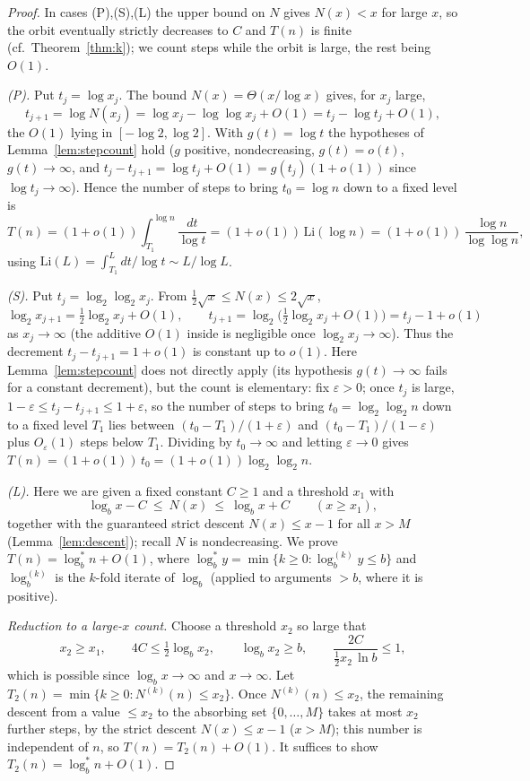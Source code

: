 \documentclass[12pt]{article}
\theoremstyle{definition}
\begin{document}
\begin{proof}
In cases (P),(S),(L) the upper bound on $N$ gives $N(x)<x$ for large $x$, so the
orbit eventually strictly decreases to $C$ and $T(n)$ is finite
(cf.\ Theorem~\ref{thm:k}); we count steps while the orbit is large, the rest being
$O(1)$.

\smallskip
\emph{(P).} Put $t_j=\log x_j$. The bound $N(x)=\Theta(x/\log x)$ gives, for $x_j$
large,
\[
  t_{j+1}=\log N(x_j)=\log x_j-\log\log x_j+O(1)=t_j-\log t_j+O(1),
\]
the $O(1)$ lying in $[-\log2,\log2]$. With $g(t)=\log t$ the hypotheses of
Lemma~\ref{lem:stepcount} hold ($g$ positive, nondecreasing, $g(t)=o(t)$,
$g(t)\to\infty$, and $t_j-t_{j+1}=\log t_j+O(1)=g(t_j)(1+o(1))$ since
$\log t_j\to\infty$). Hence the number of steps to bring $t_0=\log n$ down to a fixed
level is
\[
  T(n)=(1+o(1))\int_{T_1}^{\log n}\frac{dt}{\log t}
      =(1+o(1))\,\mathrm{Li}(\log n)
      =(1+o(1))\,\frac{\log n}{\log\log n},
\]
using $\mathrm{Li}(L)=\int_{T_1}^{L}dt/\log t\sim L/\log L$.

\smallskip
\emph{(S).} Put $t_j=\log_2\log_2 x_j$. From $\tfrac12\sqrt x\le N(x)\le2\sqrt x$,
\[
  \log_2 x_{j+1}=\tfrac12\log_2 x_j+O(1),\qquad
  t_{j+1}=\log_2\bigl(\tfrac12\log_2 x_j+O(1)\bigr)=t_j-1+o(1)
\]
as $x_j\to\infty$ (the additive $O(1)$ inside is negligible once $\log_2 x_j\to\infty$).
Thus the decrement $t_j-t_{j+1}=1+o(1)$ is constant up to $o(1)$. Here
Lemma~\ref{lem:stepcount} does not directly apply (its hypothesis $g(t)\to\infty$
fails for a constant decrement), but the count is elementary: fix $\varepsilon>0$;
once $t_j$ is large, $1-\varepsilon\le t_j-t_{j+1}\le1+\varepsilon$, so the number of
steps to bring $t_0=\log_2\log_2 n$ down to a fixed level $T_1$ lies between
$(t_0-T_1)/(1+\varepsilon)$ and $(t_0-T_1)/(1-\varepsilon)$ plus $O_\varepsilon(1)$
steps below $T_1$. Dividing by $t_0\to\infty$ and letting $\varepsilon\to0$ gives
$T(n)=(1+o(1))\,t_0=(1+o(1))\log_2\log_2 n$.

\smallskip
\emph{(L).} Here we are given a fixed constant $C\ge1$ and a threshold $x_1$ with
\[
  \log_b x - C\ \le\ N(x)\ \le\ \log_b x + C\qquad (x\ge x_1),
\]
together with the guaranteed strict descent $N(x)\le x-1$ for all $x>M$
(Lemma~\ref{lem:descent}); recall $N$ is nondecreasing. We prove
$T(n)=\log^*_b n+O(1)$, where $\log^*_b y=\min\{k\ge0:\log^{(k)}_b y\le b\}$ and
$\log^{(k)}_b$ is the $k$-fold iterate of $\log_b$ (applied to arguments $>b$, where it
is positive).

\emph{Reduction to a large-$x$ count.} Choose a threshold $x_2$ so large that
\begin{equation}
  x_2\ge x_1,\qquad 4C\le \tfrac12\log_b x_2,\qquad \log_b x_2\ge b,
  \qquad \frac{2C}{\tfrac12 x_2\,\ln b}\le 1,
  \tag{$\dagger$}
\end{equation}
which is possible since $\log_b x\to\infty$ and $x\to\infty$. Let
$T_2(n)=\min\{k\ge0:N^{(k)}(n)\le x_2\}$. Once $N^{(k)}(n)\le x_2$, the remaining
descent from a value $\le x_2$ to the absorbing set $\{0,\dots,M\}$ takes at most $x_2$
further steps, by the strict descent $N(x)\le x-1$ ($x>M$); this number is independent
of $n$, so $T(n)=T_2(n)+O(1)$. It suffices to show $T_2(n)=\log^*_b n+O(1)$.


\end{proof}
\end{document}
